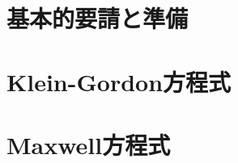 \documentclass{report}
\begin{document}
  \chapter{基本的要請と準備}
    
  \chapter{Klein-Gordon方程式}
    
  \chapter{Maxwell方程式}
    
\end{document}
